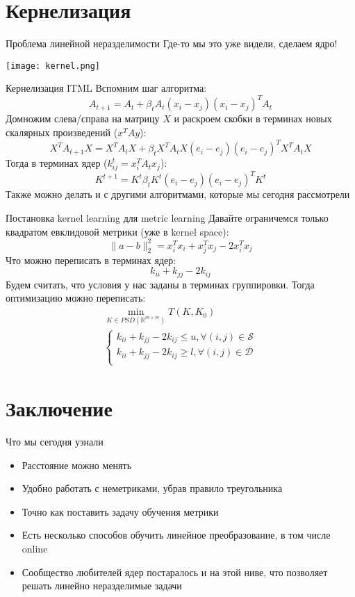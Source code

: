 \documentclass[14pt, fleqn, xcolor={dvipsnames, table}]{beamer}
\begin{document}
\section{Кернелизация}
\begin{frame}{Проблема линейной неразделимости}
Где-то мы это уже видели, сделаем ядро!
\begin{center}
\texttt{[image: kernel.png]}
\end{center}
\end{frame}

\begin{frame}{Кернелизация ITML}
Вспомним шаг алгоритма:
$$A_{t+1} = A_t + \beta_t A_t (x_i - x_j)(x_i - x_j)^TA_t$$
Домножим слева/справа на матрицу $X$ и раскроем скобки в терминах новых скалярных произведений ($x^TAy$):
$$X^TA_{t+1}X = X^TA_tX + \beta_t X^T A_tX(e_i - e_j)(e_i - e_j)^TX^TA_tX$$
Тогда в терминах ядер ($k^t_{ij} = x_i^T A_t x_j$):
$$K^{t+1} = K^{t} \beta_t K^{t} (e_i - e_j)(e_i - e_j)^T K^{t}$$
Также можно делать и с другими алгоритмами, которые мы сегодня рассмотрели
\end{frame}

\begin{frame}{Постановка kernel learning для metric learning}
\small
Давайте ограничемся только квадратом евклидовой метрики (уже в kernel space):
$$\|a - b\|_2^2 = x_i^Tx_i + x_j^T x_j - 2 x_i^T x_j$$
Что можно переписать в терминах ядер:
$$k_{ii} + k_{jj} - 2 k_{ij}$$
Будем считать, что условия у нас заданы в терминах группировки. Тогда оптимизацию можно переписать:
$$\begin{array}{l}
\min_{K\in PSD(\mathbb{R}^{m\times m})} T(K,K_0) \\
\left\{\begin{array}{l}
k_{ii} + k_{jj} - 2 k_{ij} \le u, \forall (i,j) \in \mathcal{S} \\
k_{ii} + k_{jj} - 2 k_{ij} \ge l, \forall (i,j) \in \mathcal{D} \\
\end{array}\right.
\end{array}$$
\end{frame}

\section{Заключение}
\begin{frame}{Что мы сегодня узнали}
\begin{itemize}
  \item Расстояние можно менять
  \item Удобно работать с неметриками, убрав правило треугольника
  \item Точно как поставить задачу обучения метрики
  \item Есть несколько способов обучить линейное преобразование, в том числе online
  \item Сообщество любителей ядер постаралось и на этой ниве, что позволяет решать линейно неразделимые задачи
\end{itemize}
\end{frame}
\end{document}
